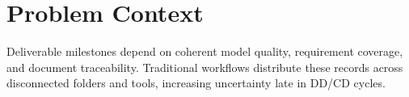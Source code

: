 \section{Problem Context}
Deliverable milestones depend on coherent model quality, requirement coverage, and document traceability. Traditional workflows distribute these records across disconnected folders and tools, increasing uncertainty late in DD/CD cycles.

